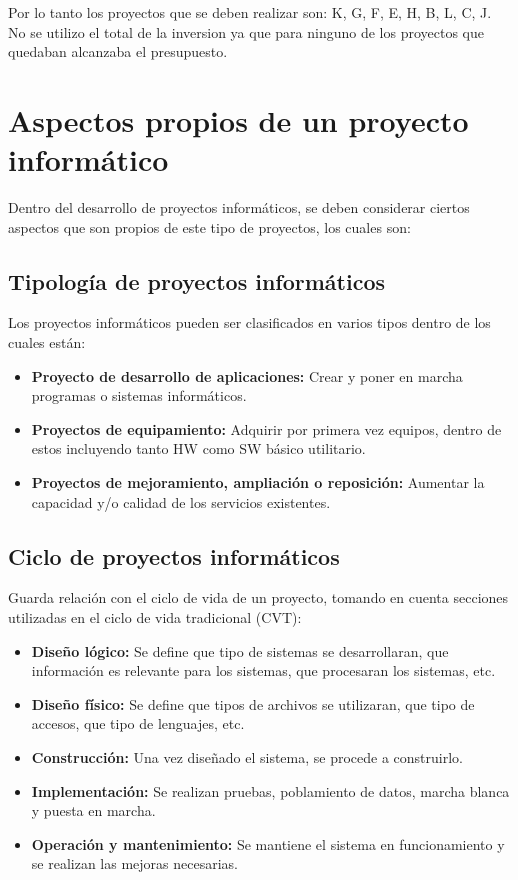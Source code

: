 \documentclass{templateNote}
\begin{document}
Por lo tanto los proyectos que se deben realizar son: K, G, F, E, H, B, L, C, J. No se utilizo el total de la inversion ya que para ninguno de los proyectos que quedaban alcanzaba el presupuesto.

\newpage
\section{Aspectos propios de un proyecto informático}
Dentro del desarrollo de proyectos informáticos, se deben considerar ciertos aspectos que son propios de este tipo de proyectos, los cuales son:

\subsection*{Tipología de proyectos informáticos}
Los proyectos informáticos pueden ser clasificados en varios tipos dentro de los cuales están:

\begin{itemize}
    \item \textbf{Proyecto de desarrollo de aplicaciones:} Crear y poner en marcha programas o sistemas informáticos.
    \item \textbf{Proyectos de equipamiento:} Adquirir por primera vez equipos, dentro de estos incluyendo tanto HW como SW básico utilitario.
    \item \textbf{Proyectos de mejoramiento, ampliación o reposición:} Aumentar la capacidad y/o calidad de los servicios existentes.
\end{itemize}

\subsection*{Ciclo de proyectos informáticos}
Guarda relación con el ciclo de vida de un proyecto, tomando en cuenta secciones utilizadas en el ciclo de vida tradicional (CVT):

\begin{itemize}
    \item \textbf{Diseño lógico:} Se define que tipo de sistemas se desarrollaran, que información es relevante para los sistemas, que procesaran los sistemas, etc.
    \item \textbf{Diseño físico:} Se define que tipos de archivos se utilizaran, que tipo de accesos, que tipo de lenguajes, etc.
    \item \textbf{Construcción:} Una vez diseñado el sistema, se procede a construirlo.
    \item \textbf{Implementación:} Se realizan pruebas, poblamiento de datos, marcha blanca y puesta en marcha.
    \item \textbf{Operación y mantenimiento:} Se mantiene el sistema en funcionamiento y se realizan las mejoras necesarias.
\end{itemize}
\end{document}
